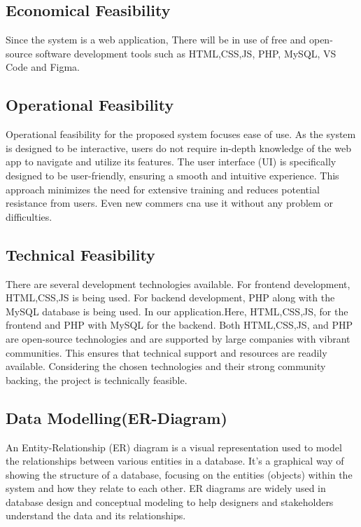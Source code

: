 \subsection{Economical Feasibility}
Since the system  is a web application, There will be in use of free and open-source software development tools such as HTML,CSS,JS, PHP, MySQL, VS Code and Figma. 
\subsection{Operational Feasibility}
Operational feasibility for the proposed system focuses ease of use. As the system is designed to be interactive, users do not require in-depth knowledge of the web app to navigate and utilize its features. The user interface (UI) is specifically designed to be user-friendly, ensuring a smooth and intuitive experience. This approach minimizes the need for extensive training and reduces potential resistance from users. Even new commers cna use it without any problem or difficulties. 
\subsection{Technical Feasibility}
There are several development technologies available. For frontend development, HTML,CSS,JS is being used. For backend development,  PHP along with the MySQL database is being used. In our application.Here, HTML,CSS,JS, for the frontend and PHP with MySQL for the backend. Both HTML,CSS,JS, and PHP are open-source technologies and are supported by large companies with vibrant communities. This ensures that technical support and resources are readily available. Considering the chosen technologies and their strong community backing, the project is technically feasible.
\newpage


\subsection{Data Modelling(ER-Diagram)}
An Entity-Relationship (ER) diagram is a visual representation used to model the relationships between various entities in a database. It's a graphical way of showing the structure of a database, focusing on the entities (objects) within the system and how they relate to each other. ER diagrams are widely used in database design and conceptual modeling to help designers and stakeholders understand the data and its relationships.

